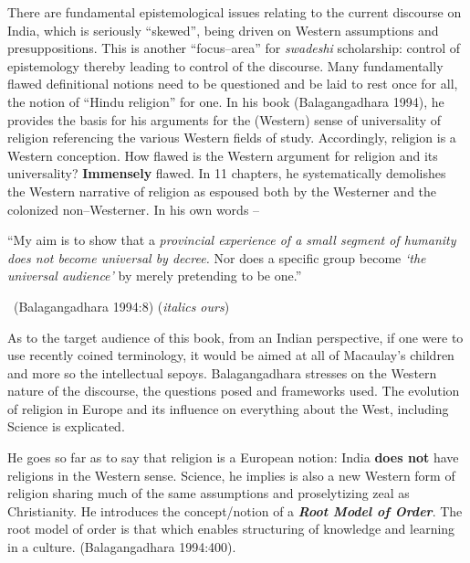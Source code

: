 There are fundamental epistemological issues relating to the current discourse on India, which is seriously “skewed”, being driven on Western assumptions and presuppositions. This is another “focus–area” for \textit{swadeshi} scholarship: control of epistemology thereby leading to control of the discourse. Many fundamentally flawed definitional notions need to be questioned and be laid to rest once for all, the notion of “Hindu religion” for one. In his book (Balagangadhara 1994), he provides the basis for his arguments for the (Western) sense of universality of religion referencing the various Western fields of study. Accordingly, religion is a Western conception. How flawed is the Western argument for religion and its universality? \textbf{Immensely} flawed. In 11 chapters, he systematically demolishes the Western narrative of religion as espoused both by the Westerner and the colonized non–Westerner. In his own words –

\begin{myquote}
“My aim is to show that a \textit{provincial experience of a small segment of humanity does not become universal by decree.} Nor does a specific group become \textit{‘the universal audience'} by merely pretending to be one.” 

~\hfill (Balagangadhara 1994:8) (\textit{italics ours})
\end{myquote}

As to the target audience of this book, from an Indian perspective, if one were to use recently coined terminology, it would be aimed at all of Macaulay's children and more so the intellectual sepoys. Balagangadhara stresses on the Western nature of the discourse, the questions posed and frameworks used. The evolution of religion in Europe and its influence on everything about the West, including Science is explicated.

He goes so far as to say that religion is a European notion: India \textbf{does not} have religions in the Western sense. Science, he implies is also a new Western form of religion sharing much of the same assumptions and proselytizing zeal as Christianity. He introduces the concept/notion of a \textbf{\textit{Root Model of Order}}. The root model of order is that which enables structuring of knowledge and learning in a culture. (Balagangadhara 1994:400).

